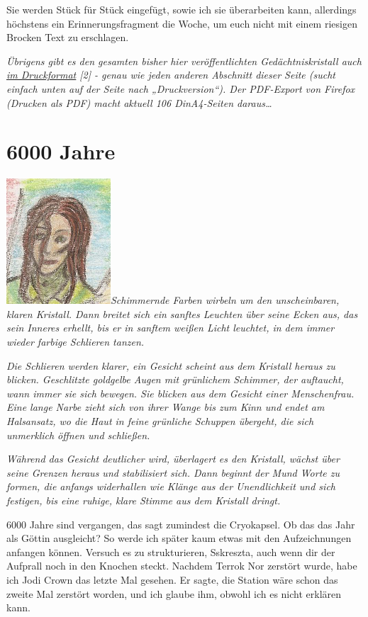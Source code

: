 \documentclass[11pt]{article}
\begin{document}
Sie werden Stück für Stück eingefügt, sowie ich sie überarbeiten kann,
allerdings höchstens ein Erinnerungsfragment die Woche, um euch nicht
mit einem riesigen Brocken Text zu erschlagen.

\emph{Übrigens gibt es den gesamten bisher hier veröffentlichten
Gedächtniskristall auch
\href{http://1w6.org/print/book/export/html/59}{im Druckformat} {[}2{]}
- genau wie jeden anderen Abschnitt dieser Seite (sucht einfach unten
auf der Seite nach „Druckversion``). Der PDF-Export von Firefox (Drucken
als PDF) macht aktuell 106 DinA4-Seiten daraus\ldots{}}

\section{6000 Jahre}

\includegraphics{sskreszta-portrait-alt-klein.png}\emph{Schimmernde
Farben wirbeln um den unscheinbaren, klaren Kristall. Dann breitet sich
ein sanftes Leuchten über seine Ecken aus, das sein Inneres erhellt, bis
er in sanftem weißen Licht leuchtet, in dem immer wieder farbige
Schlieren tanzen.}

\emph{Die Schlieren werden klarer, ein Gesicht scheint aus dem Kristall
heraus zu blicken. Geschlitzte goldgelbe Augen mit grünlichem Schimmer,
der auftaucht, wann immer sie sich bewegen. Sie blicken aus dem Gesicht
einer Menschenfrau. Eine lange Narbe zieht sich von ihrer Wange bis zum
Kinn und endet am Halsansatz, wo die Haut in feine grünliche Schuppen
übergeht, die sich unmerklich öffnen und schließen.}

\emph{Während das Gesicht deutlicher wird, überlagert es den Kristall,
wächst über seine Grenzen heraus und stabilisiert sich. Dann beginnt der
Mund Worte zu formen, die anfangs widerhallen wie Klänge aus der
Unendlichkeit und sich festigen, bis eine ruhige, klare Stimme aus dem
Kristall dringt.}

6000 Jahre sind vergangen, das sagt zumindest die Cryokapsel. Ob das das
Jahr als Göttin ausgleicht? So werde ich später kaum etwas mit den
Aufzeichnungen anfangen können. Versuch es zu strukturieren, Sskreszta,
auch wenn dir der Aufprall noch in den Knochen steckt. Nachdem Terrok
Nor zerstört wurde, habe ich Jodi Crown das letzte Mal gesehen. Er
sagte, die Station wäre schon das zweite Mal zerstört worden, und ich
glaube ihm, obwohl ich es nicht erklären kann.
\end{document}
